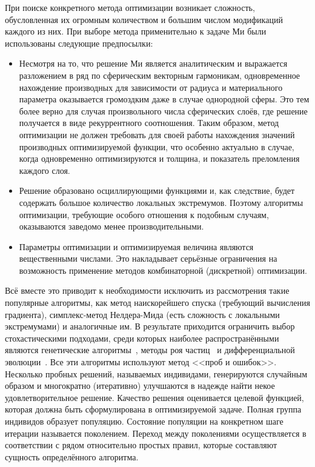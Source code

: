 При поиске конкретного метода оптимизации возникает сложность,
обусловленная их огромным количеством и большим числом
модификаций каждого из них. При выборе метода применительно к задаче
Ми были использованы следующие предпосылки:
\begin{itemize}
\item \label{ref:why-jade} Несмотря на то, что решение Ми является аналитическим и
  выражается разложением в ряд по сферическим векторным
  гармоникам, одновременное нахождение производных для зависимости от
  радиуса и материального параметра оказывается громоздким даже в
  случае однородной сферы. Это тем более верно для случая
  произвольного числа сферических слоёв, где решение получается в виде
  рекуррентного соотношения.  Таким образом, метод оптимизации не
  должен требовать для своей работы нахождения значений производных
  оптимизируемой функции, что особенно актуально в случае, когда
  одновременно оптимизируются и толщина, и показатель преломления
  каждого слоя.
\item Решение образовано осциллирующими функциями и, как следствие,
  будет содержать большое количество локальных экстремумов. Поэтому
  алгоритмы оптимизации, требующие особого отношения к подобным
  случаям, оказываются заведомо менее производительными.
\item Параметры оптимизации и оптимизируемая величина являются
  вещественными числами. Это накладывает серьёзные ограничения на
  возможность применение методов комбинаторной (дискретной) оптимизации.
\end{itemize}

Всё вместе это приводит к необходимости исключить из рассмотрения
такие популярные алгоритмы, как метод наискорейшего спуска (требующий
вычисления градиента), симплекс-метод Нелдера-Мида (есть сложность с
локальными экстремумами) и аналогичные им. В результате приходится
ограничить выбор стохастическими подходами, среди которых наиболее
распространёнными являются генетические
алгоритмы~\cite{Goldberg-GA-1989}, методы  роя
частиц~\cite{Kennedy-PSO-1995} и дифференциальной
эволюции~\cite{Storn-DE-first-1997}.  Все эти алгоритмы используют
метод <<проб и ошибок>>.  Несколько пробных решений, называемых
индивидами, генерируются случайным образом и многократно (итеративно)
улучшаются в надежде найти некое удовлетворительное решение. Качество
решения оценивается целевой функцией, которая должна быть
сформулирована в оптимизируемой задаче.  Полная группа индивидов
образует популяцию.  Состояние популяции на конкретном шаге итерации
называется поколением.  Переход между поколениями осуществляется в
соответствии с рядом относительно простых правил, которые составляют
сущность определённого алгоритма.


